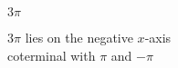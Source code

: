 {$3\pi$}
{$3\pi$ lies on the negative $x$-axis \\
coterminal with $\pi$ and $-\pi$ 

\begin{center}
\end{center}}
